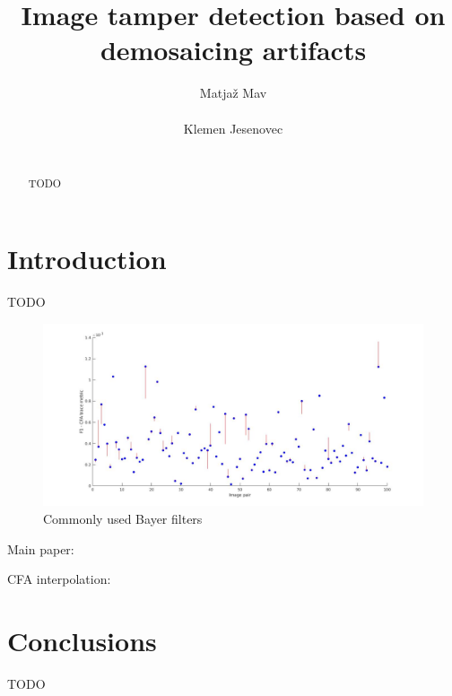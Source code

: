 \documentclass{template/acm_proc_article-sp}
\begin{document}
 

\title{Image tamper detection based on demosaicing artifacts}

\author{
\alignauthor
Matjaž Mav\\
       \\
\alignauthor
Klemen Jesenovec\\
       \\
}

\maketitle
\begin{abstract}
TODO
\end{abstract}


\section{Introduction}
TODO

\begin{figure}
    \centering
    \includegraphics[trim=0 0 0 0,clip,width=\textwidth]{results/f1_results}
    \caption{Commonly used Bayer filters}
    \label{img_4_bayer_filters}
    \end{figure}

Main paper: \cite{dirik2009image}

CFA interpolation: \cite{cfainterpolation2009}

\section{Conclusions}
TODO



\end{document}
